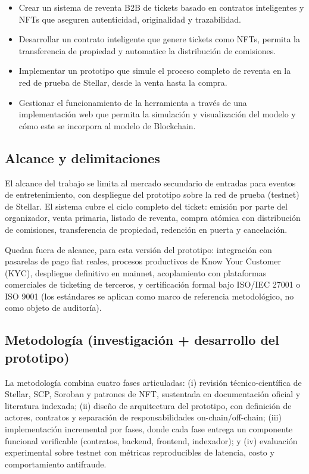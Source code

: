 \begin{itemize}
    \item Crear un sistema de reventa B2B de tickets basado en contratos inteligentes y NFTs que aseguren autenticidad, originalidad y trazabilidad.
    \item Desarrollar un contrato inteligente que genere tickets como NFTs, permita la transferencia de propiedad y automatice la distribución de comisiones.
    \item Implementar un prototipo que simule el proceso completo de reventa en la red de prueba de Stellar, desde la venta hasta la compra.
    \item Gestionar el funcionamiento de la herramienta a través de una implementación web que permita la simulación y visualización del modelo y cómo este se incorpora al modelo de Blockchain.
\end{itemize}

\subsection{Alcance y delimitaciones}

El alcance del trabajo se limita al mercado secundario de entradas para eventos de entretenimiento, con despliegue del prototipo sobre la red de prueba (testnet) de Stellar. El sistema cubre el ciclo completo del ticket: emisión por parte del organizador, venta primaria, listado de reventa, compra atómica con distribución de comisiones, transferencia de propiedad, redención en puerta y cancelación.

Quedan fuera de alcance, para esta versión del prototipo: integración con pasarelas de pago fiat reales, procesos productivos de Know Your Customer (KYC), despliegue definitivo en mainnet, acoplamiento con plataformas comerciales de ticketing de terceros, y certificación formal bajo ISO/IEC 27001 o ISO 9001 (los estándares se aplican como marco de referencia metodológico, no como objeto de auditoría).

\subsection{Metodología (investigación + desarrollo del prototipo)}

La metodología combina cuatro fases articuladas: (i) revisión técnico-científica de Stellar, SCP, Soroban y patrones de NFT, sustentada en documentación oficial y literatura indexada; (ii) diseño de arquitectura del prototipo, con definición de actores, contratos y separación de responsabilidades on-chain/off-chain; (iii) implementación incremental por fases, donde cada fase entrega un componente funcional verificable (contratos, backend, frontend, indexador); y (iv) evaluación experimental sobre testnet con métricas reproducibles de latencia, costo y comportamiento antifraude.

